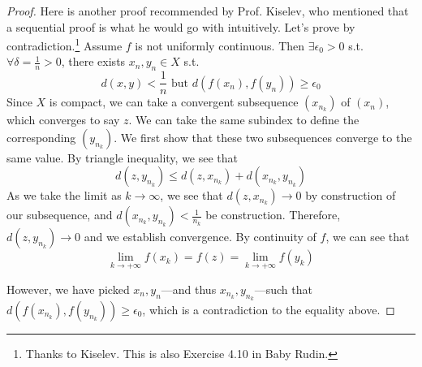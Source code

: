   \begin{proof}
    Here is another proof recommended by Prof. Kiselev, who mentioned that a sequential proof is what he would go with intuitively. Let's prove by contradiction.\footnote{Thanks to Kiselev. This is also Exercise 4.10 in Baby Rudin.} Assume $f$ is not uniformly continuous. Then $\exists \epsilon_0 > 0$ s.t. $\forall \delta = \frac{1}{n} > 0$, there exists $x_n, y_n \in X$ s.t. 
    \begin{equation}
      d(x, y) < \frac{1}{n} \text{ but } d(f(x_n), f(y_n)) \geq \epsilon_0
    \end{equation}
    Since $X$ is compact, we can take a convergent subsequence $(x_{n_k})$ of $(x_n)$, which converges to say $z$. We can take the same subindex to define the corresponding $(y_{n_k})$. We first show that these two subsequences converge to the same value. By triangle inequality, we see that
    \begin{equation}
      d(z, y_{n_k}) \leq d(z, x_{n_k}) + d(x_{n_k}, y_{n_k}) 
    \end{equation}
    As we take the limit as $k \to \infty$, we see that $d(z, x_{n_k}) \to 0$ by construction of our subsequence, and $d(x_{n_k}, y_{n_k}) < \frac{1}{n_k}$ be construction. Therefore, $d(z, y_{n_k}) \to 0$ and we establish convergence. By continuity of $f$, we can see that 
    \begin{equation}
      \lim_{k \to +\infty} f(x_k) = f(z) = \lim_{k \to +\infty} f(y_k)
    \end{equation}

    However, we have picked $x_n, y_n$---and thus $x_{n_k}, y_{n_k}$---such that $d(f(x_{n_k}), f(y_{n_k})) \geq \epsilon_0$, which is a contradiction to the equality above. 
  \end{proof} 

